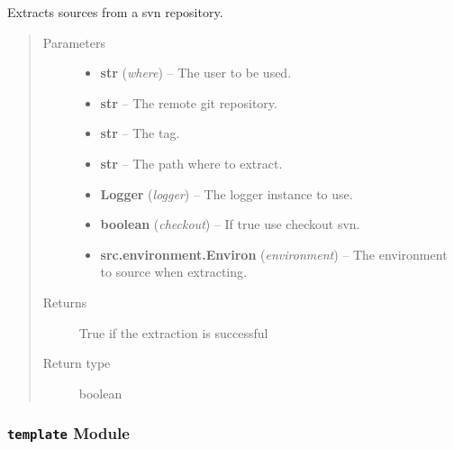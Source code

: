\documentclass[a4paper,10pt,english]{sphinxmanual}
\begin{document}

\begin{fulllineitems}
\label{commands/apidoc/src:src.system.svn_extract}
Extracts sources from a svn repository.
\begin{quote}\begin{description}
\item[{Parameters}] \leavevmode\begin{itemize}
\item {} 
\textbf{str} (\emph{where}) -- The user to be used.

\item {} 
\textbf{str} -- The remote git repository.

\item {} 
\textbf{str} -- The tag.

\item {} 
\textbf{str} -- The path where to extract.

\item {} 
\textbf{Logger} (\emph{logger}) -- The logger instance to use.

\item {} 
\textbf{boolean} (\emph{checkout}) -- If true use checkout svn.

\item {} 
\textbf{src.environment.Environ} (\emph{environment}) -- The environment to source when
extracting.

\end{itemize}

\item[{Returns}] \leavevmode
True if the extraction is successful

\item[{Return type}] \leavevmode
boolean

\end{description}\end{quote}

\end{fulllineitems}



\subsubsection{\texttt{template} Module}
\label{commands/apidoc/src:template-module}\label{commands/apidoc/src:module-src.template}
\end{document}
